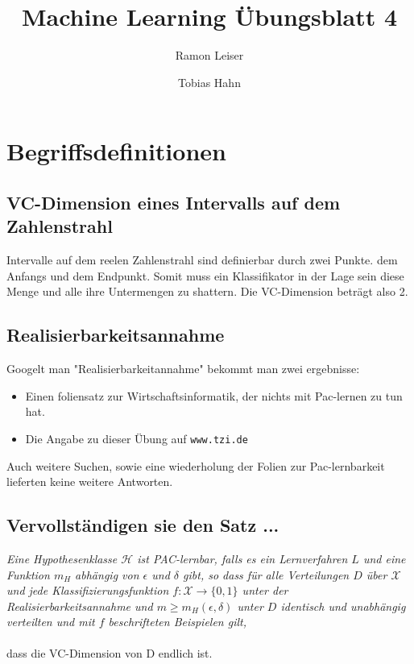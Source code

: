 \documentclass[a4paper]{article}
\title{Machine Learning Übungsblatt 4}
\author{Ramon Leiser\and Tobias Hahn}
\begin{document}
\maketitle
\newpage
 \section{Begriffsdefinitionen}
 
\subsection{VC-Dimension eines Intervalls auf dem Zahlenstrahl}
Intervalle auf dem reelen Zahlenstrahl sind definierbar durch zwei Punkte. dem Anfangs und dem Endpunkt. Somit muss ein Klassifikator in der Lage sein diese Menge und alle ihre Untermengen zu shattern. Die VC-Dimension beträgt also 2.

\subsection{Realisierbarkeitsannahme}
Googelt man "Realisierbarkeitannahme" bekommt man zwei ergebnisse:
\begin{itemize}
\item Einen foliensatz zur Wirtschaftsinformatik, der nichts mit Pac-lernen zu tun hat.
\item Die Angabe zu dieser Übung auf \texttt{www.tzi.de}
\end{itemize}
Auch weitere Suchen, sowie eine wiederholung der Folien zur Pac-lernbarkeit lieferten keine weitere Antworten.\\


\subsection{Vervollständigen sie den Satz ...}
\textit{Eine Hypothesenklasse $\mathcal{H}$  ist PAC-lernbar, falls es ein Lernverfahren $L$ und eine Funktion $m_H$ abhängig von $\epsilon$ und $\delta$ gibt, so dass für alle Verteilungen $D$ über $\mathcal{X}$ und jede Klassifizierungsfunktion $f : \mathcal{X} \rightarrow \{0, 1\}$ unter der Realisierbarkeitsannahme und $ m \geq m_H(\epsilon, \delta) $ unter $D$ identisch und unabhängig verteilten und mit $f$ beschrifteten Beispielen gilt, }\\\\
dass die VC-Dimension von D endlich ist.
\end{document}
